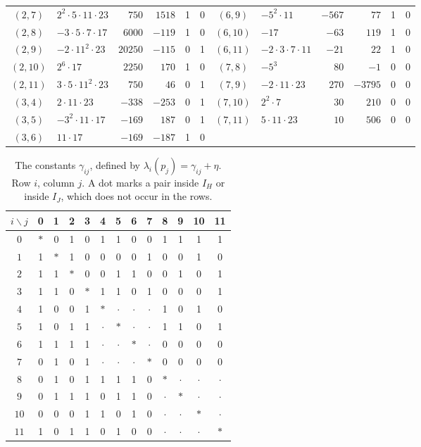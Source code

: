 \begin{table}[htbp]
\begin{tabular}{clrrcc@{\hspace{1.6em}}clrrcc}
$(2,7)$ & $2^{2}\cdot5\cdot11\cdot23$ & $750$ & $1518$ & 1 & 0 & $(6,9)$ & $-5^{2}\cdot11$ & $-567$ & $77$ & 1 & 0 \\
$(2,8)$ & $-3\cdot5\cdot7\cdot17$ & $6000$ & $-119$ & 1 & 0 & $(6,10)$ & $-17$ & $-63$ & $119$ & 1 & 0 \\
$(2,9)$ & $-2\cdot11^{2}\cdot23$ & $20250$ & $-115$ & 0 & 1 & $(6,11)$ & $-2\cdot3\cdot7\cdot11$ & $-21$ & $22$ & 1 & 0 \\
$(2,10)$ & $2^{6}\cdot17$ & $2250$ & $170$ & 1 & 0 & $(7,8)$ & $-5^{3}$ & $80$ & $-1$ & 0 & 0 \\
$(2,11)$ & $3\cdot5\cdot11^{2}\cdot23$ & $750$ & $46$ & 0 & 1 & $(7,9)$ & $-2\cdot11\cdot23$ & $270$ & $-3795$ & 0 & 0 \\
$(3,4)$ & $2\cdot11\cdot23$ & $-338$ & $-253$ & 0 & 1 & $(7,10)$ & $2^{2}\cdot7$ & $30$ & $210$ & 0 & 0 \\
$(3,5)$ & $-3^{2}\cdot11\cdot17$ & $-169$ & $187$ & 0 & 1 & $(7,11)$ & $5\cdot11\cdot23$ & $10$ & $506$ & 0 & 0 \\
$(3,6)$ & $11\cdot17$ & $-169$ & $-187$ & 1 & 0 & & & & & & \\
\bottomrule
\end{tabular}
\end{table}

\begin{table}[htbp]
\centering
\caption{The constants $\gamma_{ij}$, defined by $\lambda_i(p_j)=\gamma_{ij}+\eta$. Row $i$, column $j$. A dot marks a pair inside $I_H$ or inside $I_J$, which does not occur in the rows.}
\label{tab:r6-cross}
\begin{tabular}{c*{12}{c}}
\toprule
$i\backslash j$ & 0 & 1 & 2 & 3 & 4 & 5 & 6 & 7 & 8 & 9 & 10 & 11\\
\midrule
$0$ & $\ast$ & 0 & 1 & 0 & 1 & 1 & 0 & 0 & 1 & 1 & 1 & 1 \\
$1$ & 1 & $\ast$ & 1 & 0 & 0 & 0 & 0 & 1 & 0 & 0 & 1 & 0 \\
$2$ & 1 & 1 & $\ast$ & 0 & 0 & 1 & 1 & 0 & 0 & 1 & 0 & 1 \\
$3$ & 1 & 1 & 0 & $\ast$ & 1 & 1 & 0 & 1 & 0 & 0 & 0 & 1 \\
$4$ & 1 & 0 & 0 & 1 & $\ast$ & $\cdot$ & $\cdot$ & $\cdot$ & 1 & 0 & 1 & 0 \\
$5$ & 1 & 0 & 1 & 1 & $\cdot$ & $\ast$ & $\cdot$ & $\cdot$ & 1 & 1 & 0 & 1 \\
$6$ & 1 & 1 & 1 & 1 & $\cdot$ & $\cdot$ & $\ast$ & $\cdot$ & 0 & 0 & 0 & 0 \\
$7$ & 0 & 1 & 0 & 1 & $\cdot$ & $\cdot$ & $\cdot$ & $\ast$ & 0 & 0 & 0 & 0 \\
$8$ & 0 & 1 & 0 & 1 & 1 & 1 & 1 & 0 & $\ast$ & $\cdot$ & $\cdot$ & $\cdot$ \\
$9$ & 0 & 1 & 1 & 1 & 0 & 1 & 1 & 0 & $\cdot$ & $\ast$ & $\cdot$ & $\cdot$ \\
$10$ & 0 & 0 & 0 & 1 & 1 & 0 & 1 & 0 & $\cdot$ & $\cdot$ & $\ast$ & $\cdot$ \\
$11$ & 1 & 0 & 1 & 1 & 0 & 1 & 0 & 0 & $\cdot$ & $\cdot$ & $\cdot$ & $\ast$ \\
\bottomrule
\end{tabular}
\end{table}

